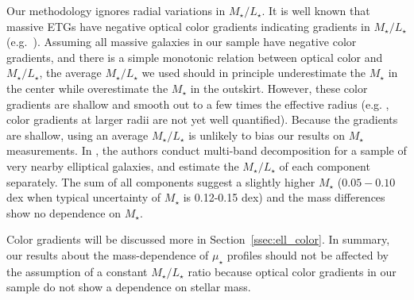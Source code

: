\documentclass[a4paper,fleqn,usenatbib]{mnras}
\def\ser{{S\'{e}rsic\ }}
\def\mstar{{$M_{\star}$}}
\def\m2l{{$M_{\star}/L_{\star}$}}
\def\mden{{$\mu_{\star}$}}
\begin{document}
    Our methodology ignores radial variations in \m2l{}. 
    It is well known that massive ETGs have negative optical color gradients 
    indicating gradients in \m2l{} (e.g.\ \citealt{Carollo1993, Davies1993, 
    LaBarbera2012, DSouza2015}). 
    Assuming all massive galaxies in our sample have negative color gradients, and 
    there is a simple monotonic relation between optical color and \m2l{}, the
    average \m2l{} we used should in principle underestimate the \mstar{} in the 
    center while overestimate the \mstar{} in the outskirt.
    However, these color gradients are shallow and smooth out to a few times the 
    effective radius (e.g. \citealt{LaBarbera2010, Tal2011, DSouza2014}, 
    color gradients at larger radii are not yet well quantified). 
    Because the gradients are shallow, using an average \m2l{} is unlikely to bias our
    results on \mstar{} measurements.  
    In \citet{Huang2016}, the authors conduct multi-band decomposition for a sample 
    of very nearby elliptical galaxies, and estimate the \m2l{} of each component 
    separately. 
    The sum of all components suggest a slightly higher \mstar{} ($0.05-0.10$ dex when
    typical uncertainty of \mstar{} is 0.12-0.15 dex) and the mass differences show
    no dependence on \mstar{}. 
 
    Color gradients will be discussed more in Section~\ref{ssec:ell_color}. 
    In summary, our results about the mass-dependence of \mden{} profiles should not 
    be affected by the assumption of a constant \m2l{} ratio because optical color 
    gradients in our sample do not show a dependence on stellar mass.
    
    
    
\end{document}
